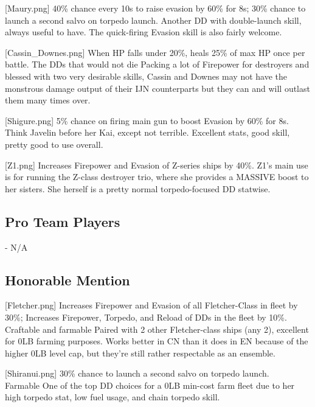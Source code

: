 [Maury.png]
{40\% chance every 10s to raise evasion by 60\% for 8s; 30\% chance to launch a second salvo on torpedo launch.}
{}
{Another DD with double-launch skill, always useful to have. The quick-firing Evasion skill is also fairly welcome.}
 
[Cassin_Downes.png]
{When HP falls under 20\%, heals 25\% of max HP once per battle.}
{The DDs that would not die}
{Packing a lot of Firepower for destroyers and blessed with two very desirable skills, Cassin and Downes may not have the monstrous damage output of their IJN counterparts but they can and will outlast them many times over.}

[Shigure.png]
{5\% chance on firing main gun to boost Evasion by 60\% for 8s.}
{}
{Think Javelin before her Kai, except not terrible. Excellent stats, good skill, pretty good to use overall.}
 
[Z1.png]
{Increases Firepower and Evasion of Z-series ships by 40\%.}
{}
{Z1's main use is for running the Z-class destroyer trio, where she provides a MASSIVE boost to her sisters. She herself is a pretty normal torpedo-focused DD statwise.}

 
\newpage
\subsection{Pro Team Players}
- N/A
 
 
\newpage
\subsection{Honorable Mention}
[Fletcher.png]
{Increases Firepower and Evasion of all Fletcher-Class in fleet by 30\%; Increases Firepower, Torpedo, and Reload of DDs in the fleet by 10\%.\\
Craftable and farmable}
{}
{Paired with 2 other Fletcher-class ships (any 2), excellent for 0LB farming purposes. Works better in CN than it does in EN because of the higher 0LB level cap, but they're still rather respectable as an ensemble.}

[Shiranui.png]
{30\% chance to launch a second salvo on torpedo launch.\\
Farmable}
{}
{One of the top DD choices for a 0LB min-cost farm fleet due to her high torpedo stat, low fuel usage, and chain torpedo skill.}
 
 
 
